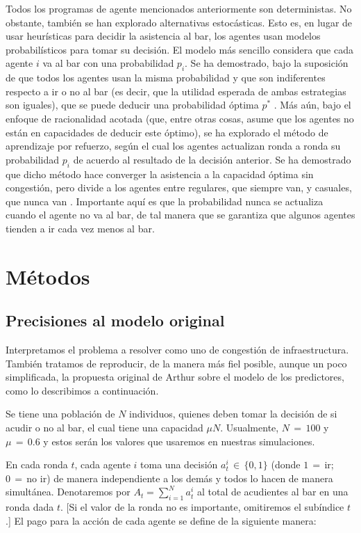 \documentclass[11pt]{amsart}
\begin{document}
Todos los programas de agente mencionados anteriormente son deterministas. No obstante, también se han explorado alternativas estocásticas. Esto es, en lugar de usar heurísticas para decidir la asistencia al bar, los agentes usan modelos probabilísticos para tomar su decisión. El modelo más sencillo considera que cada agente $i$ va al bar con una probabilidad $p_i$. Se ha demostrado, bajo la suposición de que todos los agentes usan la misma probabilidad y que son indiferentes respecto a ir o no al bar (es decir, que la utilidad esperada de ambas estrategias son iguales), que se puede deducir una probabilidad óptima $p^*$ \cite{Franke2003, Bell2003}. Más aún, bajo el enfoque de racionalidad acotada (que, entre otras cosas, asume que los agentes no están en capacidades de deducir este óptimo), se ha explorado el método de aprendizaje por refuerzo, según el cual los agentes actualizan ronda a ronda su probabilidad $p_i$ de acuerdo al resultado de la decisión anterior. Se ha demostrado que dicho método hace converger la asistencia a la capacidad óptima sin congestión, pero divide a los agentes entre regulares, que siempre van, y casuales, que nunca van \cite{Franke2003, Bell2003}. Importante aquí es que la probabilidad nunca se actualiza cuando el agente no va al bar, de tal manera que se garantiza que algunos agentes tienden a ir cada vez menos al bar. 

\section{Métodos}\label{sec:met}

\subsection{Precisiones al modelo original}
Interpretamos el problema a resolver como uno de congestión de infraestructura. También tratamos de reproducir, de la manera más fiel posible, aunque un poco simplificada, la propuesta original de Arthur sobre el modelo de los predictores, como lo describimos a continuación.

Se tiene una población de $N$ individuos, quienes deben tomar la decisión de si acudir o no al bar, el cual tiene una capacidad $\mu N$. Usualmente, $N\,{=}\,100$ y $\mu\,{=}\,0.6$ y estos serán los valores que usaremos en nuestras simulaciones. 

En cada ronda $t$, cada agente $i$ toma una decisión $a^i_t\,{\in}\,\{0,1\}$ (donde $1\,{=}\,$ir; $0\,{=}\,$no ir) de manera independiente a los demás y todos lo hacen de manera simultánea. Denotaremos por $A_t = \sum_{i=1}^N a^i_t$ al total de acudientes al bar en una ronda dada $t$. [Si el valor de la ronda no es importante, omitiremos el subíndice $t$.] El pago para la acción de cada agente se define de la siguiente manera:
\end{document}
